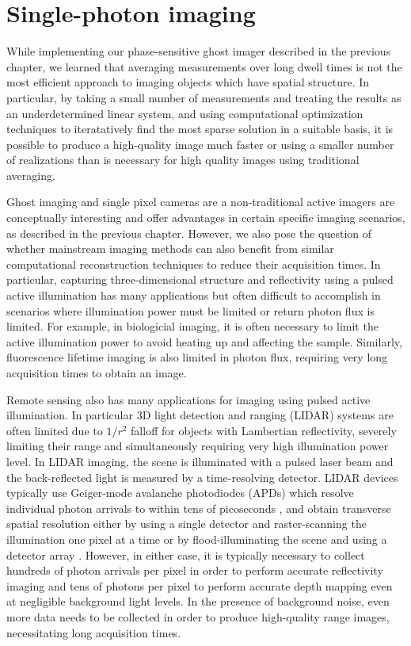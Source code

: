 \chapter{Single-photon imaging}

While implementing our phase-sensitive ghost imager described in the previous chapter, we learned that averaging measurements over long dwell times is not the most efficient approach to imaging objects which have spatial structure. In particular, by taking a small number of measurements and treating the results as an underdetermined linear system, and using computational optimization techniques to iteratatively find the most sparse solution in a suitable basis, it is possible to produce a high-quality image much faster or using a smaller number of realizations than is necessary for high quality images using traditional averaging.

Ghost imaging and single pixel cameras are a non-traditional active imagers are conceptually interesting and offer advantages in certain specific imaging scenarios, as described in the previous chapter. However, we also pose the question of whether mainstream imaging methods can also benefit from similar computational reconstruction techniques to reduce their acquisition times. In particular, capturing three-dimensional structure and reflectivity using a pulsed active illumination has many applications \cite{nicolas-applications} but often difficult to accomplish in scenarios where illumination power must be limited or return photon flux is limited. For example, in biologicial imaging, it is often necessary to limit the active illumination power to avoid heating up and affecting the sample. Similarly, fluorescence lifetime imaging \cite{becker-fluorescence} is also limited in photon flux, requiring very long acquisition times to obtain an image.

Remote sensing also has many applications for imaging using pulsed active illumination. In particular 3D light detection and ranging (LIDAR) systems are often limited due to $1/r^2$ falloff for objects with Lambertian reflectivity, severely limiting their range and simultaneously requiring very high illumination power level. In LIDAR imaging, the scene is illuminated with a pulsed laser beam and the back-reflected light is measured by a time-resolving detector. LIDAR devices typically use Geiger-mode avalanche photodiodes (APDs) which resolve individual photon arrivals to within tens of picoseconds \cite{savage-single}, and obtain transverse spatial resolution either by using a single detector and raster-scanning the illumination one pixel at a time \cite{buller-ranging} or by flood-illuminating the scene and using a detector array \cite{jack-hgcdte}. However, in either case, it is typically necessary to collect hundreds of photon arrivals per pixel in order to perform accurate reflectivity imaging and tens of photons per pixel to perform accurate depth mapping \cite{albota-three,degnan-photon,snyder-random,obrien-simulation,mccarthy-kilometer,pellegrini-laser} even at negligible background light levels. In the presence of background noise, even more data needs to be collected in order to produce high-quality range images, necessitating long acquisition times.

